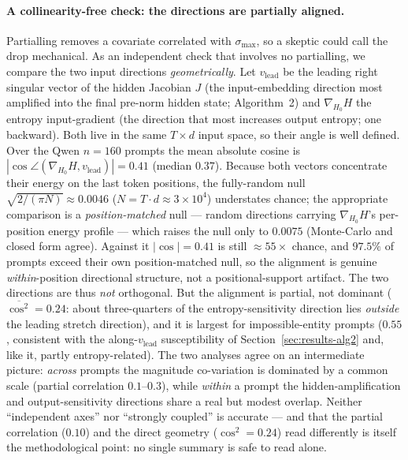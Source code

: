 \documentclass{article}
\begin{document}
\paragraph{A collinearity-free check: the directions are partially aligned.}
Partialling removes a covariate correlated with $\sigma_{\max}$, so a skeptic could call the drop
mechanical. As an independent check that involves no partialling, we compare the two input directions
\emph{geometrically}. Let $v_{\mathrm{lead}}$ be the leading right singular vector of the hidden
Jacobian $J$ (the input-embedding direction most amplified into the final pre-norm hidden state;
Algorithm~2) and $\nabla_{H_0}H$ the entropy input-gradient (the direction that most increases output
entropy; one backward). Both live in the same $T\times d$ input space, so their angle is well defined.
Over the Qwen $n=160$ prompts the mean absolute cosine is
$|\!\cos\angle(\nabla_{H_0}H,v_{\mathrm{lead}})|=0.41$ (median $0.37$). Because both vectors concentrate
their energy on the last token positions, the fully-random null $\sqrt{2/(\pi N)}\approx0.0046$
($N=T\!\cdot\!d\approx3\times10^4$) understates chance; the appropriate comparison is a
\emph{position-matched} null --- random directions carrying $\nabla_{H_0}H$'s per-position energy
profile --- which raises the null only to $0.0075$ (Monte-Carlo and closed form agree). Against it
$|\!\cos|=0.41$ is still $\approx\!55\times$ chance, and $97.5\%$ of prompts exceed their own
position-matched null, so the alignment is genuine \emph{within}-position directional structure, not a
positional-support artifact. The two directions are thus \emph{not} orthogonal. But the alignment is
partial, not dominant ($\overline{\cos^2}=0.24$: about three-quarters of the entropy-sensitivity
direction lies \emph{outside} the leading stretch direction), and it is largest for
impossible-entity prompts ($0.55$, consistent with the along-$v_{\mathrm{lead}}$ susceptibility of
Section~\ref{sec:results-alg2} and, like it, partly entropy-related). The two analyses agree on an intermediate
picture: \emph{across} prompts the magnitude co-variation is dominated by a common scale (partial
correlation $0.1$--$0.3$), while \emph{within} a prompt the hidden-amplification and output-sensitivity
directions share a real but modest overlap. Neither ``independent axes'' nor ``strongly coupled'' is
accurate --- and that the partial correlation ($0.10$) and the direct geometry ($\cos^2=0.24$) read
differently is itself the methodological point: no single summary is safe to read alone.
\end{document}
